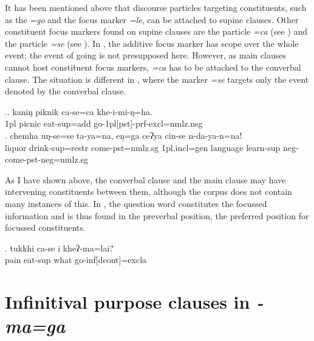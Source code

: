 \largerpage[1]
It has been  mentioned above that discourse particles targeting constituents, such as the  \emph{=go} and the focus marker \emph{=le}, can be attached to supine clauses. Other constituent focus markers found on supine clauses are the  particle \emph{=ca}  (see \Next[a]) and the  particle \emph{=se} (see \Next[b]). In \Next[a], the additive focus marker has scope over the whole event; the event of going is not presupposed here. However, as main clauses cannot host constituent focus markers, \emph{=ca} has to be attached to the converbal clause. The situation is different in \Next[b], where the  marker \emph{=se} targets only  the event denoted by the converbal clause.

		
	\ex.\ag.      kaniŋ piknik ca-se=ca                khe-i-mi-ŋ=ha.\\
		{\sc 1pl} picnic eat{\sc -sup=add} go{\sc -1pl[pst]-prf-excl=nmlz.nsg}\\
		  
	\bg. chemha uŋ-se=se ta-ya=na, eŋ=ga ceʔya cin-se n-da-ya-n=na!\\
	liquor   drink{\sc -sup=restr} come{\sc [3sg]-pst=nmlz.sg} {\sc 1pl.incl=gen} language   learn{\sc -sup} {\sc neg-}come{\sc [3sg]-pst-neg=nmlz.sg}\\
	
As I have shown above, the converbal clause and the main clause may have intervening constituents between them, although the corpus does not contain many instances of this. In \Next, the question word  constitutes the focussed information and is thus found in the preverbal position, the preferred  position for focussed constituents.

\exg.   tukkhi ca-se      i    kheʔ-ma=lai?\\
		 pain  eat{\sc -sup} what go{\sc -inf[deont]=excla}\\
		  
	

\section{Infinitival purpose clauses in \emph{-ma=ga}}\label{maga}

